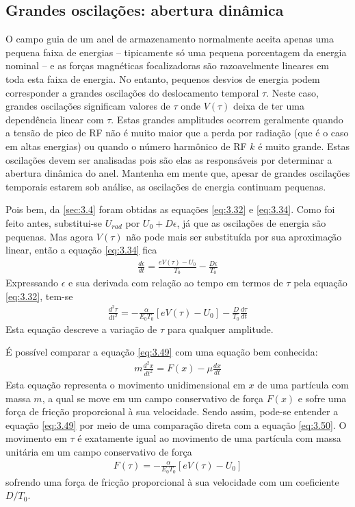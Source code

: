 \subsection{Grandes oscilações: abertura dinâmica}\label{sec:3.6}
O campo guia de um anel de armazenamento normalmente aceita apenas uma pequena faixa de energias -- tipicamente só uma pequena porcentagem da energia nominal -- e as forças magnéticas focalizadoras são razoavelmente lineares em toda esta faixa de energia. No entanto, pequenos desvios de energia podem corresponder a grandes oscilações do deslocamento temporal $\tau$. Neste caso, grandes oscilações significam valores de $\tau$ onde $V(\tau)$ deixa de ter uma dependência linear com $\tau$. Estas grandes amplitudes ocorrem geralmente quando a tensão de pico de RF não é muito maior que a perda por radiação (que é o caso em altas energias) ou quando o número harmônico de RF $k$ é muito grande. Estas oscilações devem ser analisadas pois são elas as responsáveis por determinar a abertura dinâmica do anel. Mantenha em mente que, apesar de grandes oscilações temporais estarem sob análise, as oscilações de energia continuam pequenas.

Pois bem, da \autoref{sec:3.4} foram obtidas as equações \eqref{eq:3.32} e \eqref{eq:3.34}. Como foi feito antes, substitui-se $U_{rad}$ por $U_0 +D\epsilon$, já que as oscilações de energia são pequenas. Mas agora $V(\tau)$ não pode mais ser substituída por sua aproximação linear, então a equação \eqref{eq:3.34} fica
\begin{align}
	\frac{d\epsilon}{dt} = \frac{eV(\tau) - U_0}{T_0} - \frac{D\epsilon}{T_0}
\end{align}
Expressando $\epsilon$ e sua derivada com relação ao tempo em termos de $\tau$ pela equação \eqref{eq:3.32}, tem-se
\begin{align}
	\frac{d^2 \tau}{dt^2} = -\frac{\alpha}{E_0 T_0}[eV(\tau)-U_0] - \frac{D}{T_0}\frac{d\tau}{dt}\label{eq:3.49}
\end{align}
Esta equação descreve a variação de $\tau$ para qualquer amplitude.

É possível comparar a equação \eqref{eq:3.49} com uma equação bem conhecida:
\begin{align}
	m\frac{d^2x}{dt^2} = F(x) - \mu\frac{dx}{dt}\label{eq:3.50}
\end{align}
Esta equação representa o movimento unidimensional em $x$ de uma partícula com massa $m$, a qual se move em um campo conservativo de força $F(x)$ e sofre uma força de fricção proporcional à sua velocidade. Sendo assim, pode-se entender a equação \eqref{eq:3.49} por meio de uma comparação direta com a equação \eqref{eq:3.50}. O movimento em $\tau$ é exatamente igual ao movimento de uma partícula com massa unitária em um campo conservativo de força
\begin{align}
	F(\tau) = -\frac{\alpha}{E_0 T_0}[eV(\tau) - U_0]\label{eq:3.51}
\end{align}
sofrendo uma força de fricção proporcional à sua velocidade com um coeficiente $D/T_0$.

